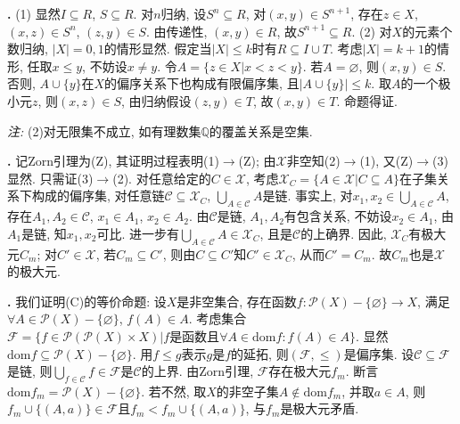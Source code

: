 \par \textbf{\thesolset .} (1) 显然$I\subseteq R$, $S\subseteq R$. 对$n$归纳, 设$S^n\subseteq R$, 对$(x,y)\in S^{n+1}$, 存在$z\in X$, $(x,z)\in S^n$, $(z,y)\in S$. 由传递性, $(x,y)\in R$, 故$S^{n+1}\subseteq R$. (2) 对$X$的元素个数归纳, $|X|=0,1$的情形显然. 假定当$|X|\le k$时有$R\subseteq I\cup T$. 考虑$|X|=k+1$的情形, 任取$x\le y$, 不妨设$x\neq y$. 令$A=\{z\in X\vert x<z<y\}$. 若$A=\varnothing$, 则$(x,y)\in S$. 否则, $A\cup \{y\}$在$X$的偏序关系下也构成有限偏序集, 且$|A\cup \{y\}|\le k$. 取$A$的一个极小元$z$, 则$(x,z)\in S$, 由归纳假设$(z,y)\in T$, 故$(x,y)\in T$. 命题得证. 
\par \emph{注:} (2)对无限集不成立, 如有理数集$\mathbb{Q}$的覆盖关系是空集. 

\par \textbf{\thesolset .} 记Zorn引理为(Z), 其证明过程表明(1)$\to$(Z); 由$\mathcal{X}$非空知(2)$\to$(1), 又(Z)$\to$(3)显然. 只需证(3)$\to$(2). 对任意给定的$C\in \mathcal{X}$, 考虑$\mathcal{X}_C=\{A\in \mathcal{X}\vert C\subseteq A\}$在子集关系下构成的偏序集, 对任意链$\mathcal{C} \subseteq \mathcal{X}_C$, $\bigcup_{A\in \mathcal{C}} A$是链. 事实上, 对$x_1,x_2\in \bigcup_{A\in \mathcal{C}} A$, 存在$A_1, A_2\in \mathcal{C}$, $x_1\in A_1$, $x_2\in A_2$. 由$\mathcal{C}$是链, $A_1, A_2$有包含关系, 不妨设$x_2\in A_1$, 由$A_1$是链, 知$x_1,x_2$可比. 进一步有$\bigcup_{A\in \mathcal{C}} A\in \mathcal{X}_C$, 且是$\mathcal{C}$的上确界. 因此, $\mathcal{X}_C$有极大元$C_m$; 对$C'\in \mathcal{X}$, 若$C_m\subseteq C'$, 则由$C\subseteq C'$知$C'\in \mathcal{X}_C$, 从而$C'=C_m$. 故$C_m$也是$\mathcal{X}$的极大元. 

\par \textbf{\thesolset .} \cite{NST} 我们证明(C)的等价命题: 设$X$是非空集合, 存在函数$f:\mathcal{P}(X)-\{\varnothing\}\to X$, 满足$\forall A\in \mathcal{P}(X)-\{\varnothing\}$, $f(A)\in A$. 考虑集合$\mathcal{F}=\{f\in \mathcal{P}(\mathcal{P}(X)\times X)\vert f\text{是函数且}\forall A\in \text{dom}f: f(A)\in A\}$. 显然$\text{dom}f\subseteq \mathcal{P}(X)-\{\varnothing\}$. 用$f\le g$表示$g$是$f$的延拓, 则$(\mathcal{F},\le)$是偏序集. 设$\mathcal{C}\subseteq \mathcal{F}$是链, 则$\bigcup_{f\in \mathcal{C}} f\in \mathcal{F}$是$\mathcal{C}$的上界. 由Zorn引理, $\mathcal{F}$存在极大元$f_m$. 断言$\text{dom}f_m=\mathcal{P}(X)-\{\varnothing\}$. 若不然, 取$X$的非空子集$A\notin \text{dom}f_m$, 并取$a\in A$, 则$f_m \cup \{(A,a)\}\in \mathcal{F}$且$f_m < f_m \cup \{(A,a)\}$, 与$f_m$是极大元矛盾. 

